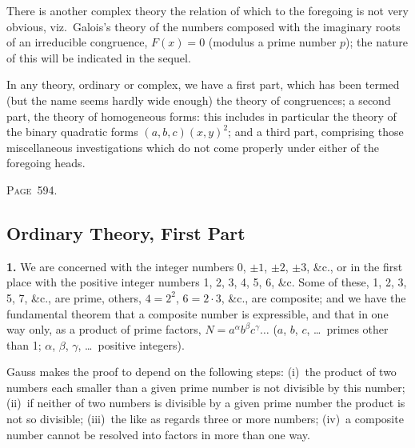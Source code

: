 \documentclass[11pt,a4paper]{article}
\theoremstyle{definition}
\begin{document}
There is another complex theory the relation of which to the foregoing is not very obvious, viz.\ Galois's theory of the numbers composed with the imaginary roots of an irreducible congruence, $F(x)=0$ (modulus a prime number $p$); the nature of this will be indicated in the sequel.

In any theory, ordinary or complex, we have a first part, which has been termed (but the name seems hardly wide enough) the theory of congruences; a second part, the theory of homogeneous forms: this includes in particular the theory of the binary quadratic forms $(a,b,c)(x,y)^2$; and a third part, comprising those miscellaneous investigations which do not come properly under either of the foregoing heads.

\newpage
\noindent\textsc{Page~594.} \subsection*{Ordinary Theory, First Part}

\textbf{1.} We are concerned with the integer numbers 0, $\pm 1$, $\pm 2$, $\pm 3$, \&c., or in the first place with the positive integer numbers 1, 2, 3, 4, 5, 6, \&c. Some of these, 1, 2, 3, 5, 7, \&c., are prime, others, $4=2^2$, $6=2\cdot 3$, \&c., are composite; and we have the fundamental theorem that a composite number is expressible, and that in one way only, as a product of prime factors, $N=a^\alpha b^\beta c^\gamma\ldots$ ($a$, $b$, $c$, \ldots\ primes other than 1; $\alpha$, $\beta$, $\gamma$, \ldots\ positive integers).

Gauss makes the proof to depend on the following steps: (i)~the product of two numbers each smaller than a given prime number is not divisible by this number; (ii)~if neither of two numbers is divisible by a given prime number the product is not so divisible; (iii)~the like as regards three or more numbers; (iv)~a composite number cannot be resolved into factors in more than one way.
\end{document}

